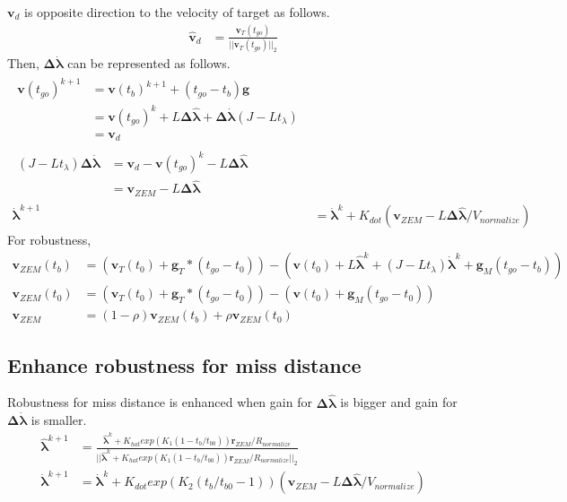 \documentclass{fdclreport}
\begin{document}
$\bm{v}_d$ is opposite direction to the velocity of target as follows.
\begin{align}
	\bm{\hat{v}}_d &= \frac{\bm{v}_{T}(t_{go})}{||\bm{v}_{T}(t_{go})||_2}
\end{align}
Then, $\bm{\Delta \dot{\lambda}}$ can be represented as follows.
\begin{align}
\begin{split}
	\bm{v}(t_{go})^{k+1} &= \bm{v}(t_{b})^{k+1} + (t_{go} - t_b)\bm{g} \\
											 &= \bm{v}(t_{go})^{k} + L \bm{\Delta \hat{\lambda}} + \bm{\Delta \dot{\lambda}} (J - L t_{\lambda}) \\
											 &= \bm{v}_d
\end{split}\\
\begin{split}
	(J-Lt_{\lambda}) \bm{\Delta \dot{\lambda}} &= \bm{v}_d - \bm{v}(t_{go})^k - L \bm{\Delta \hat{\lambda}} \\
																						 &= \bm{v}_{ZEM} - L \bm{\Delta \hat{\lambda}}
\end{split} \\
	\bm{\dot{\lambda}}^{k+1} &= \bm{\dot{\lambda}}^{k} + K_{dot} (\bm{v}_{ZEM} - L \bm{\Delta \hat{\lambda}} / V_{normalize})
\end{align}
For robustness,
\begin{align}
	\bm{v}_{ZEM}(t_b) &= (\bm{v}_T(t_0) + \bm{g}_T * (t_{go} - t_0)) - (\bm{v}(t_0) + L \bm{\hat{\lambda}}^{k} + (J-L t_{\lambda}) \bm{\dot{\lambda}}^{k} + \bm{g}_M (t_{go} - t_b)) \\
	\bm{v}_{ZEM}(t_0) &= (\bm{v}_T(t_0) + \bm{g}_T * (t_{go} - t_0)) - (\bm{v}(t_0) + \bm{g}_M (t_{go} - t_0)) \\
	\bm{v}_{ZEM} &= (1-\rho) \bm{v}_{ZEM}(t_b) + \rho \bm{v}_{ZEM}(t_0)
\end{align}

\subsection{Enhance robustness for miss distance}
Robustness for miss distance is enhanced when gain for $\bm{\Delta \hat{\lambda}}$ is bigger and gain for $\bm{\Delta \dot{\lambda}}$ is smaller.
\begin{align}
	\bm{\hat{\lambda}}^{k+1} &= \frac{\bm{\hat{\lambda}}^{k} + K_{hat} exp(K_{1}(1-t_b/t_{b0})) \bm{r}_{ZEM}/R_{normalize}}{||\bm{\hat{\lambda}}^{k} + K_{hat} exp(K_{1}(1-t_b/t_{b0})) \bm{r}_{ZEM}/R_{normalize}||_2} \\
	\bm{\dot{\lambda}}^{k+1} &= \bm{\dot{\lambda}}^{k} + K_{dot} exp(K_{2}(t_b/t_{b0}-1)) (\bm{v}_{ZEM} - L \bm{\Delta \hat{\lambda}} / V_{normalize})
\end{align}
\end{document}
